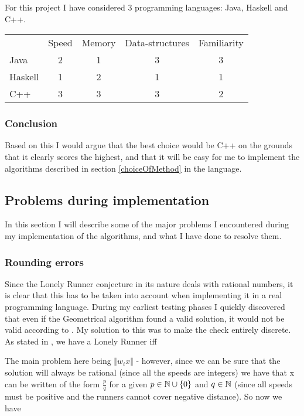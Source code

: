 For this project I have considered 3 programming languages: Java, Haskell and C++.

\begin{tabular}{l|c|c|c|c}
        & Speed & Memory & Data-structures & Familiarity \\
Java    & 2     &  1     &  3              &   3  \\
Haskell & 1     &  2     &  1              &   1  \\
C++     & 3     &  3     &  3              &   2  \\
\end{tabular}

\subsubsection{Conclusion}
Based on this I would argue that the best choice would be C++ on the grounds that it clearly scores the highest, and that it will be easy for me to implement the algorithms described in section \ref{choiceOfMethod} in the language.

\subsection{Problems during implementation}
In this section I will describe some of the major problems I encountered during my implementation of the algorithms, and what I have done to resolve them.

\subsubsection{Rounding errors}
Since the Lonely Runner conjecture in its nature deals with rational numbers, it is clear that this has to be taken into account when implementing it in a real programming language. During my earliest testing phases I quickly discovered that even if the Geometrical algorithm found a valid solution, it would not be valid according to . My solution to this was to make the check entirely discrete. As stated in , we have a Lonely Runner iff

The main problem here being $\Vert w_i x\Vert$ - however, since we can be sure that the solution will always be rational (since all the speeds are integers) we have that x can be written of the form $\frac{p}{q}$ for a given $p \in \mathbb{N}\cup\{0\}$ and $q \in \mathbb{N}$ (since all speeds must be positive and the runners cannot cover negative distance). So now we have

